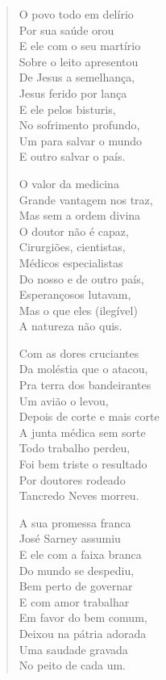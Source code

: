 \begin{verse}
O povo todo em delírio\\
Por sua saúde orou\\
E ele com o seu martírio\\
Sobre o leito apresentou\\
De Jesus a semelhança,\\
Jesus ferido por lança\\
E ele pelos bisturis,\\
No sofrimento profundo,\\
Um para salvar o mundo\\
E outro salvar o país.

O valor da medicina\\
Grande vantagem nos traz,\\
Mas sem a ordem divina\\
O doutor não é capaz,\\
Cirurgiões, cientistas,\\
Médicos especialistas\\
Do nosso e de outro país,\\
Esperançosos lutavam,\\
Mas o que eles (ilegível)\\
A natureza não quis.

Com as dores cruciantes\\
Da moléstia que o atacou,\\
Pra terra dos bandeirantes\\
Um avião o levou,\\
Depois de corte e mais corte\\
A junta médica sem sorte\\
Todo trabalho perdeu,\\
Foi bem triste o resultado\\
Por doutores rodeado\\
Tancredo Neves morreu.

A sua promessa franca\\
José Sarney assumiu\\
E ele com a faixa branca\\
Do mundo se despediu,\\
Bem perto de governar\\
E com amor trabalhar\\
Em favor do bem comum,\\
Deixou na pátria adorada\\
Uma saudade gravada\\
No peito de cada um.
\end{verse}

